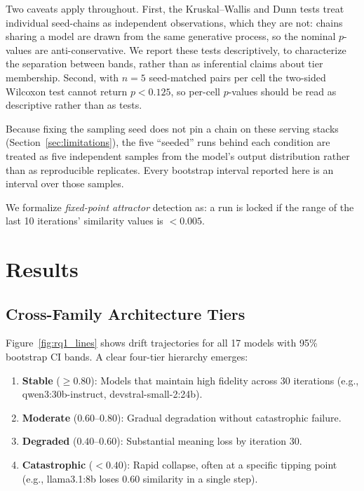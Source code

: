 \documentclass[11pt]{article}
\begin{document}
Two caveats apply throughout. First, the Kruskal--Wallis and Dunn tests treat
individual seed-chains as independent observations, which they are not: chains
sharing a model are drawn from the same generative process, so the nominal
$p$-values are anti-conservative. We report these tests descriptively, to
characterize the separation between bands, rather than as inferential claims
about tier membership. Second, with $n=5$ seed-matched pairs per cell the
two-sided Wilcoxon test cannot return $p<0.125$, so per-cell $p$-values should
be read as descriptive rather than as tests.

Because fixing the sampling seed does not pin a chain on these serving stacks
(Section~\ref{sec:limitations}), the five ``seeded'' runs behind each condition
are treated as five independent samples from the model's output distribution
rather than as reproducible replicates. Every bootstrap interval reported here
is an interval over those samples.

We formalize \emph{fixed-point attractor} detection as: a run is locked if
the range of the last 10 iterations' similarity values is $<0.005$.

\section{Results}
\label{sec:results}

\subsection{Cross-Family Architecture Tiers}
\label{sec:rq1}

Figure~\ref{fig:rq1_lines} shows drift trajectories for all 17 models with
95\% bootstrap CI bands. A clear four-tier hierarchy emerges:

\begin{enumerate}[leftmargin=*]
  \item \textbf{Stable} ($\geq 0.80$): Models that maintain high fidelity
        across 30 iterations (e.g., qwen3:30b-instruct, devstral-small-2:24b).
  \item \textbf{Moderate} ($0.60$--$0.80$): Gradual degradation without
        catastrophic failure.
  \item \textbf{Degraded} ($0.40$--$0.60$): Substantial meaning loss by
        iteration 30.
  \item \textbf{Catastrophic} ($< 0.40$): Rapid collapse, often at a specific
        tipping point (e.g., llama3.1:8b loses 0.60 similarity in a single step).
\end{enumerate}
\end{document}

